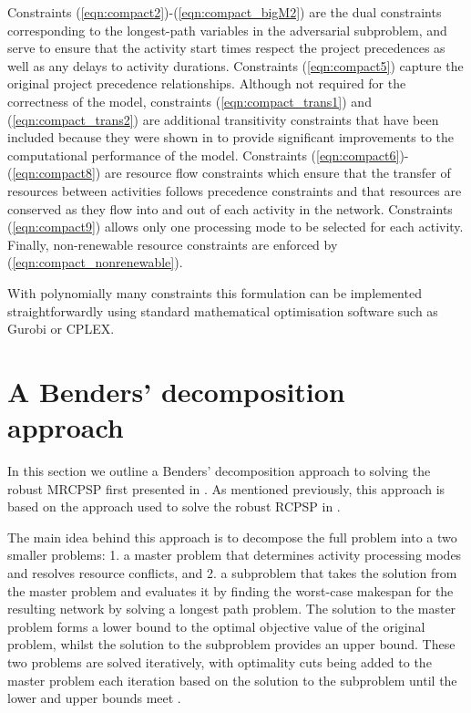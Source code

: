 \documentclass[a4paper,abstracton]{scrartcl}
\begin{document}
Constraints (\ref{eqn:compact2})-(\ref{eqn:compact_bigM2}) are the dual constraints corresponding to the longest-path variables in the adversarial subproblem, and serve to ensure that the activity start times respect the project precedences as well as any delays to activity durations. Constraints (\ref{eqn:compact5}) capture the original project precedence relationships. Although not required for the correctness of the model, constraints (\ref{eqn:compact_trans1}) and (\ref{eqn:compact_trans2}) are additional transitivity constraints that have been included because they were shown in \cite{bold2021compact} to provide significant improvements to the computational performance of the model. Constraints (\ref{eqn:compact6})-(\ref{eqn:compact8}) are resource flow constraints which ensure that the transfer of resources between activities follows precedence constraints and that resources are conserved as they flow into and out of each activity in the network. Constraints (\ref{eqn:compact9}) allows only one processing mode to be selected for each activity. Finally, non-renewable resource constraints are enforced by (\ref{eqn:compact_nonrenewable}).



With polynomially many constraints this formulation can be implemented straightforwardly using standard mathematical optimisation software such as Gurobi or CPLEX.

\section{A Benders' decomposition approach}

In this section we outline a Benders' decomposition approach to solving the robust MRCPSP first presented in \cite{balouka2021robust}. As mentioned previously, this approach is based on the approach used to solve the robust RCPSP in \cite{bruni2017adjustable}.

The main idea behind this approach is to decompose the full problem into a two smaller problems: 1. a master problem that determines activity processing modes and resolves resource conflicts, and 2. a subproblem that takes the solution from the master problem and evaluates it by finding the worst-case makespan for the resulting network by solving a longest path problem. The solution to the master problem forms a lower bound to the optimal objective value of the original problem, whilst the solution to the subproblem provides an upper bound. These two problems are solved iteratively, with optimality cuts being added to the master problem each iteration based on the solution to the subproblem until the lower and upper bounds meet .
\end{document}
